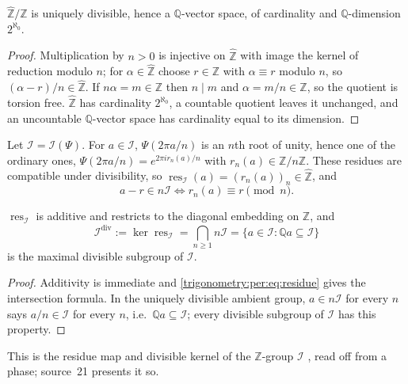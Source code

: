 \documentclass[11pt,letterpaper]{article}
\numberwithin{equation}{section}
\theoremstyle{definition}
\theoremstyle{remark}
\newcommand{\Q}{\mathbb Q}
\newcommand{\Z}{\mathbb Z}
\newcommand{\res}{\operatorname{res}}
\newcommand{\Zhat}{\widehat{\Z}}
\newcommand{\cI}{\mathcal I}
\begin{document}
\begin{lemma}\label{trigonometry:per:lem:zhat}
$\Zhat/\Z$ is uniquely divisible, hence a $\Q$-vector space, of cardinality and $\Q$-dimension
$2^{\aleph_0}$.
\end{lemma}
\begin{proof}
Multiplication by $n>0$ is injective on $\Zhat$ with image the kernel of reduction modulo $n$; for
$\alpha\in\Zhat$ choose $r\in\Z$ with $\alpha\equiv r$ modulo $n$, so $(\alpha-r)/n\in\Zhat$. If
$n\alpha=m\in\Z$ then $n\mid m$ and $\alpha=m/n\in\Z$, so the quotient is torsion free. $\Zhat$ has
cardinality $2^{\aleph_0}$, a countable quotient leaves it unchanged, and an uncountable
$\Q$-vector space has cardinality equal to its dimension.
\end{proof}

Let $\cI=\cI(\Psi)$. For $a\in\cI$, $\Psi(2\pi a/n)$ is an $n$th root of unity, hence one of the
ordinary ones, $\Psi(2\pi a/n)=e^{2\pi ir_n(a)/n}$ with $r_n(a)\in\Z/n\Z$. These residues are compatible
under divisibility, so $\res_{\cI}(a)=(r_n(a))_n\in\Zhat$, and
\begin{equation}\label{trigonometry:per:eq:residue}
 a-r\in n\cI\iff r_n(a)\equiv r\pmod n .
\end{equation}
\begin{proposition}\label{trigonometry:per:prop:divisible}
$\res_{\cI}$ is additive and restricts to the diagonal embedding on $\Z$, and
\[
 \cI^{\mathrm{div}}:=\ker\res_{\cI}=\bigcap_{n\ge1}n\cI=\{a\in\cI:\Q a\subseteq\cI\}
\]
is the maximal divisible subgroup of $\cI$.
\end{proposition}
\begin{proof}
Additivity is immediate and \cref{trigonometry:per:eq:residue} gives the intersection formula. In the
uniquely divisible ambient group, $a\in n\cI$ for every $n$ says $a/n\in\cI$ for every $n$, i.e.\
$\Q a\subseteq\cI$; every divisible subgroup of $\cI$ has this property.
\end{proof}
This is the residue map and divisible kernel of the $\Z$-group $\cI$ \cite[Proposition 4.1 and
Remark 4.2]{Jerabek}, read off from a phase; source~21 presents it so.
\end{document}

